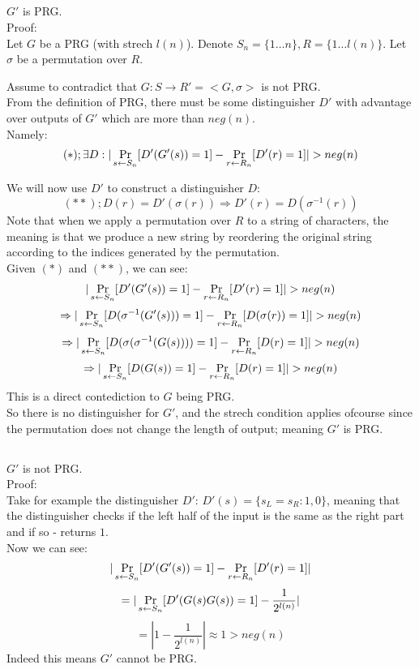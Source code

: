 \subsection{}
$G'$ is PRG.\\
Proof:\\
Let $G$ be a PRG (with strech $l(n)$).
Denote $S_n=\{1\ldots n\}, R=\{1\ldots l(n)\}$.
Let $\sigma$ be a permutation over $R$.

Assume to contradict that $G:S\longrightarrow R' = <G,\sigma>$ is not PRG.\\
From the definition of PRG, there must be some distinguisher $D'$
with advantage over outputs of $G'$ which are more than $neg(n)$.\\
Namely:
\[
	(*); \exists D: |\operatorname*{Pr}_{s\leftarrow S_n}[D'(G'(s))=1]
		-\operatorname*{Pr}_{r\leftarrow R_n}[D'(r)=1]| > neg(n)
\]

We will now use $D'$ to construct a distinguisher $D$:
\[
	(**); D(r)=D'(\sigma(r))
	\Rightarrow D'(r)=D(\sigma^{-1}(r)) 
\]
Note that when we apply a permutation over $R$ to a string of characters,
the meaning is that we produce a new string by reordering the original string
according to the indices generated by the permutation.\\

Given $(*)$ and $(**)$, we can see:
\[
	|\operatorname*{Pr}_{s\leftarrow S_n}[D'(G'(s))=1]
		-\operatorname*{Pr}_{r\leftarrow R_n}[D'(r)=1]| > neg(n)\]\[
	\Rightarrow |\operatorname*{Pr}_{s\leftarrow S_n}[D(\sigma^{-1}(G'(s)))=1]
		-\operatorname*{Pr}_{r\leftarrow R_n}[D(\sigma(r))=1]| > neg(n)\]\[
	\Rightarrow |\operatorname*{Pr}_{s\leftarrow S_n}[D(\sigma(\sigma^{-1}(G(s))))=1]
		-\operatorname*{Pr}_{r\leftarrow R_n}[D(r)=1]| > neg(n)\]\[
	\Rightarrow |\operatorname*{Pr}_{s\leftarrow S_n}[D(G(s))=1]
		-\operatorname*{Pr}_{r\leftarrow R_n}[D(r)=1]| > neg(n)	
\]
This is a direct contediction to $G$ being PRG.\\
So there is no distinguisher for $G'$, and the strech condition applies ofcourse
since the permutation does not change the length of output; meaning $G'$ is PRG.

\subsection{}
$G'$ is not PRG.\\
Proof:\\
Take for example the distinguisher $D'$:
$D'(s)=\{s_L=s_R:1, 0\}$, meaning that the distinguisher checks if the left 
half of the input is the same as the right part and if so - returns $1$.\\
Now we can see:
\[
	|\operatorname*{Pr}_{s\leftarrow S_n}[D'(G'(s))=1]
		-\operatorname*{Pr}_{r\leftarrow R_n}[D'(r)=1]|\]\[
	= |\operatorname*{Pr}_{s\leftarrow S_n}[D'(G(s)G(s))=1]
		-\frac{1}{2^{l(n)}}|\]\[
	= |1-\frac{1}{2^{l(n)}}|\approx 1 > neg(n)
\]
Indeed this means $G'$ cannot be PRG.

